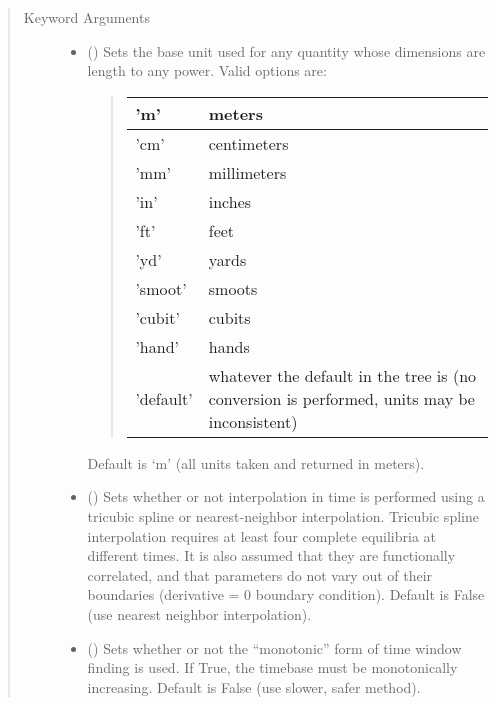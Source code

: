 \documentclass[letterpaper,10pt,english]{sphinxmanual}
\begin{document}
\begin{fulllineitems}
\begin{quote}
\begin{description}
\begin{itemize}
\end{itemize}

\item[{Keyword Arguments}] \leavevmode\begin{itemize}
\item {} 
 () \textendash{} 
Sets the base unit used for any
quantity whose dimensions are length to any power.
Valid options are:
\begin{quote}


\begin{savenotes}\sphinxattablestart
\centering
\begin{tabulary}{\linewidth}[t]{|T|T|}
\hline

’m’
&
meters
\\
\hline
’cm’
&
centimeters
\\
\hline
’mm’
&
millimeters
\\
\hline
’in’
&
inches
\\
\hline
’ft’
&
feet
\\
\hline
’yd’
&
yards
\\
\hline
’smoot’
&
smoots
\\
\hline
’cubit’
&
cubits
\\
\hline
’hand’
&
hands
\\
\hline
’default’
&
whatever the default in the tree is (no conversion is performed, units may be inconsistent)
\\
\hline
\end{tabulary}
\par
\sphinxattableend\end{savenotes}
\end{quote}

Default is ‘m’ (all units taken and returned in meters).


\item {} 
 () \textendash{} Sets whether or not interpolation in time is
performed using a tricubic spline or nearest-neighbor
interpolation. Tricubic spline interpolation requires at least
four complete equilibria at different times. It is also assumed
that they are functionally correlated, and that parameters do
not vary out of their boundaries (derivative = 0 boundary
condition). Default is False (use nearest neighbor interpolation).

\item {} 
 () \textendash{} Sets whether or not the “monotonic” form of time
window finding is used. If True, the timebase must be
monotonically increasing. Default is False (use slower,
safer method).


\end{itemize}
\end{description}
\end{quote}
\end{fulllineitems}
\end{document}
